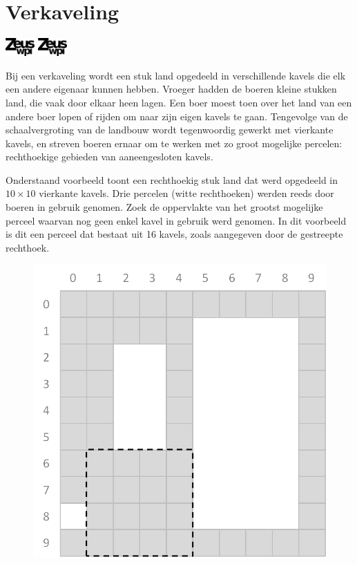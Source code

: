 \documentclass[a4paper]{article}
\begin{document}
\section*{Verkaveling}
\flushright
\includegraphics[width=3em]{../logo-new.png}
\includegraphics[width=3em]{../logo-new.png}
\flushleft

Bij een verkaveling wordt een stuk land opgedeeld in verschillende kavels die elk een andere eigenaar kunnen hebben. Vroeger hadden de boeren kleine stukken land, die vaak door elkaar heen lagen. Een boer moest toen over het land van een andere boer lopen of rijden om naar zijn eigen kavels te gaan. Tengevolge van de schaalvergroting van de landbouw wordt tegenwoordig gewerkt met vierkante kavels, en streven boeren ernaar om te werken met zo groot mogelijke percelen: rechthoekige gebieden van aaneengesloten kavels.

Onderstaand voorbeeld toont een rechthoekig stuk land dat werd opgedeeld in $10 \times 10$ vierkante kavels. Drie percelen (witte rechthoeken) werden reeds door boeren in gebruik genomen. Zoek de oppervlakte van het grootst mogelijke perceel waarvan nog geen enkel kavel in gebruik werd genomen. In dit voorbeeld is dit een perceel dat bestaat uit 16 kavels, zoals aangegeven door de gestreepte rechthoek.

\begin{figure}[H]
  \center \includegraphics[scale=0.30]{verkaveling.png}
\end{figure}
\end{document}
